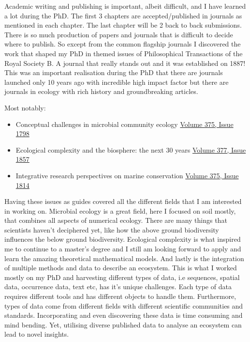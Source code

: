 \documentclass[
11pt, %
english, %
singlespacing, %
liststotoc, %
toctotoc, %
headsepline, %
]{MastersDoctoralThesis} %
\begin{document}
Academic writing and publishing is important, albeit difficult, and I have learned a
lot during the PhD. The first 3 chapters are accepted/published in journals as
mentioned in each chapter. The last chapter will be 2 back to back submissions.
There is so much production of papers and journals that is difficult to decide where to publish. 
So except from the common flagship journals I discovered the work that shaped my 
PhD in themed issues of Philosophical Transactions of the Royal Society B.
A journal that really stands out and it was established on 1887! This was an
important realisation during the PhD that there are journals launched only 10 years
ago with incredible high impact factor but there are journals in ecology
with rich history and groundbreaking articles.

Most notably:

\begin{itemize}
    \item Conceptual challenges in microbial community ecology \href{https://doi.org/10.1098/rstb.2019.0241}{Volume 375, Issue 1798}
    \item Ecological complexity and the biosphere: the next 30 years \href{https://doi.org/10.1098/rstb.2021.0376}{Volume 377, Issue 1857}
    \item Integrative research perspectives on marine conservation \href{https://doi.org/10.1098/rstb.2019.0444}{Volume 375, Issue 1814}
\end{itemize}

Having these issues as guides covered all the different fields that I am interested 
in working on. Microbial ecology is a great field, here I focused on soil mostly, that
combines all aspects of numerical ecology. There are many things that scientists 
haven't deciphered yet, like how the above ground biodiversity influences the below
ground biodiversity. Ecological complexity is what inspired me to continue to a 
master's degree and I still am looking forward to apply and learn the amazing 
theoretical mathematical models. And lastly is the integration of multiple methods 
and data to describe an ecosystem. This is what I worked mostly on my PhD and 
harvesting different types of data, i.e sequences, spatial data, occurrence data, 
text etc, has it's unique challenges. Each type of data requires different tools and has 
different objects to handle them. Furthermore, types of data come from different 
fields with different scientific communities and standards. Incorporating and even 
discovering these data is time consuming and mind bending. Yet, utilising diverse 
published data to analyse an ecosystem can lead to novel insights. 
\end{document}
